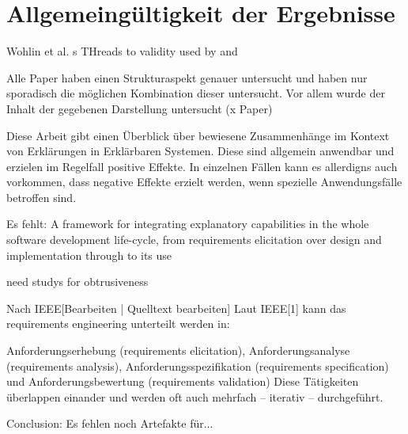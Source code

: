 \chapter{Allgemeingültigkeit der Ergebnisse}

Wohlin et al. s THreads to validity \cite{wohlin2012experimentation} used by \cite{ghazi2016exploratory} and \cite{carvalho2020developers}

Alle Paper haben einen Strukturaspekt genauer untersucht und haben nur sporadisch die möglichen Kombination dieser untersucht. Vor allem wurde der Inhalt der gegebenen Darstellung untersucht (x Paper)

Diese Arbeit gibt einen Überblick über bewiesene Zusammenhänge im Kontext von Erklärungen in Erklärbaren Systemen. Diese sind allgemein anwendbar und erzielen im Regelfall positive Effekte. In einzelnen Fällen kann es allerdigns auch vorkommen, dass negative Effekte erzielt werden, wenn spezielle Anwendungsfälle betroffen sind.

Es fehlt: A framework for integrating explanatory capabilities in the whole software development life-cycle, from requirements elicitation over design and implementation through to its use \cite{cassens_ambient_2019}

need studys for obtrusiveness \cite{lim_2009_assessing}

Nach IEEE[Bearbeiten | Quelltext bearbeiten]
Laut IEEE[1] kann das requirements engineering unterteilt werden in:

Anforderungserhebung (requirements elicitation),
Anforderungsanalyse (requirements analysis),
Anforderungsspezifikation (requirements specification) und
Anforderungsbewertung (requirements validation)
Diese Tätigkeiten überlappen einander und werden oft auch mehrfach – iterativ – durchgeführt.

Conclusion: Es fehlen noch Artefakte für...